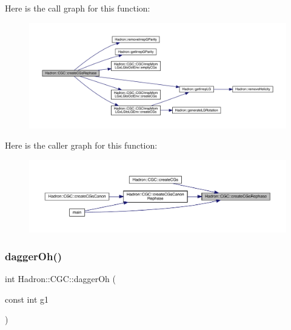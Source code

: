 Here is the call graph for this function\+:\nopagebreak
\begin{figure}[H]
\begin{center}
\leavevmode
\includegraphics[width=350pt]{d9/d19/namespaceHadron_1_1CGC_acb590dcbf6bd9f515f07a8e64aa76c0b_cgraph}
\end{center}
\end{figure}
Here is the caller graph for this function\+:
\nopagebreak
\begin{figure}[H]
\begin{center}
\leavevmode
\includegraphics[width=350pt]{d9/d19/namespaceHadron_1_1CGC_acb590dcbf6bd9f515f07a8e64aa76c0b_icgraph}
\end{center}
\end{figure}
\mbox{\label{namespaceHadron_1_1CGC_a90d3161b56ca289f2c3f62fa91923dac}} 
\subsubsection{\texorpdfstring{daggerOh()}{daggerOh()}}
{\footnotesize\ttfamily int Hadron\+::\+C\+G\+C\+::dagger\+Oh (\begin{DoxyParamCaption}\item[{const int}]{g1 }\end{DoxyParamCaption})}

